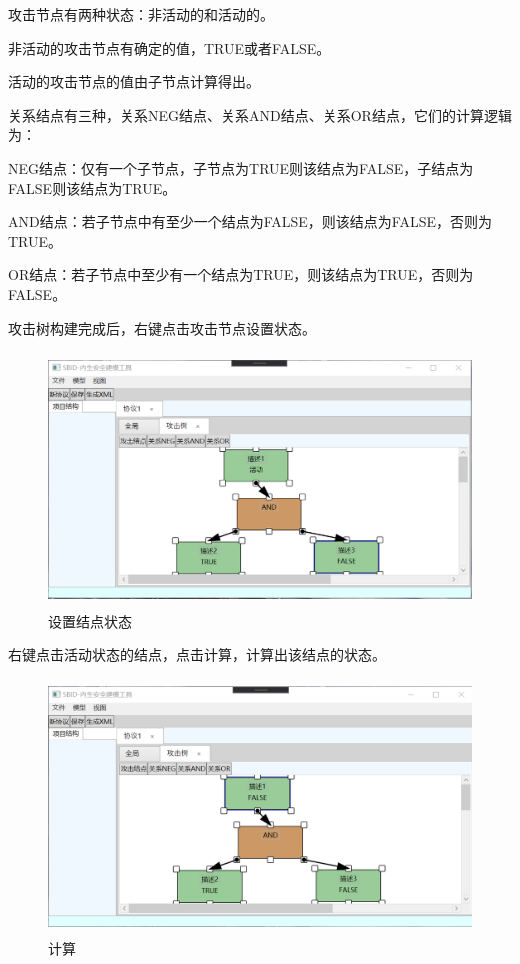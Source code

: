 \par
攻击节点有两种状态：非活动的和活动的。
\par
非活动的攻击节点有确定的值，TRUE或者FALSE。
\par
活动的攻击节点的值由子节点计算得出。
\par
关系结点有三种，关系NEG结点、关系AND结点、关系OR结点，它们的计算逻辑为：
\par
NEG结点：仅有一个子节点，子节点为TRUE则该结点为FALSE，子结点为FALSE则该结点为TRUE。
\par
AND结点：若子节点中有至少一个结点为FALSE，则该结点为FALSE，否则为TRUE。
\par
OR结点：若子节点中至少有一个结点为TRUE，则该结点为TRUE，否则为FALSE。

\par
攻击树构建完成后，右键点击攻击节点设置状态。

\begin{figure}[h]
	\centering
	\includegraphics[width=12cm,height=6.75cm]{imgs/attack_tree_condition.png}
	\caption{设置结点状态}
	\label{attack_tree_condition}
\end{figure}

\par
右键点击活动状态的结点，点击计算，计算出该结点的状态。

\begin{figure}[h]
	\centering
	\includegraphics[width=12cm,height=6.75cm]{imgs/attack_tree_calculate.png}
	\caption{计算}
	\label{attack_tree_calculate}
\end{figure}